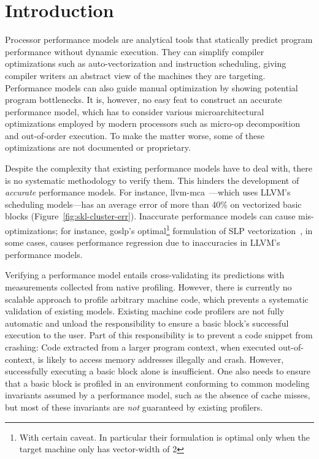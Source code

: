 \section{Introduction}
Processor performance models are analytical tools that statically predict
program performance without dynamic execution.
They can simplify compiler optimizations such as
auto-vectorization and instruction scheduling,
giving compiler writers an abstract view of the machines they are targeting.
Performance models can also guide manual optimization by showing
potential program bottlenecks.
It is, however, no easy feat to construct an accurate performance model,
which has to consider various microarchitectural optimizations employed by
modern processors such as micro-op decomposition and out-of-order execution.
To make the matter worse, some of these optimizations 
are not documented or proprietary.

Despite the complexity that existing performance models have to deal with,
there is no systematic methodology to verify them. 
This hinders the development of \emph{accurate} performance models.
For instance, llvm-mca~\cite{llvm-mca}---which uses 
LLVM's scheduling models---has an average error of more than 40\% on vectorized
basic blocks (Figure~\ref{fig:skl-cluster-err}).
Inaccurate performance models can cause mis-optimizations;
for instance, goslp's \cite{goslp} optimal\footnote{
With certain caveat.
In particular their formulation is optimal only when the target machine only has vector-width of 2} 
formulation of SLP vectorization~\cite{slp},
in some cases, causes performance regression due to inaccuracies in LLVM's~\cite{llvm} performance models.


Verifying a performance model
entails cross-validating its predictions with
measurements collected
from native profiling.
However, there is currently no scalable approach 
to profile arbitrary machine code, which 
prevents a systematic validation of existing models.
Existing machine code profilers are not fully automatic and
unload the responsibility to ensure a basic block's successful
execution to the user.
Part of this responsibility is to prevent a code snippet from crashing: 
Code extracted from a larger program context, when executed
out-of-context, is likely to access memory addresses illegally and crash.
However, successfully executing a basic block alone is insufficient.
One also needs to ensure that a basic block 
is profiled in an environment
conforming to common modeling invariants
assumed by a performance model,
such as the absence of cache misses,
but most of these invariants are \textit{not}
guaranteed by existing profilers.

